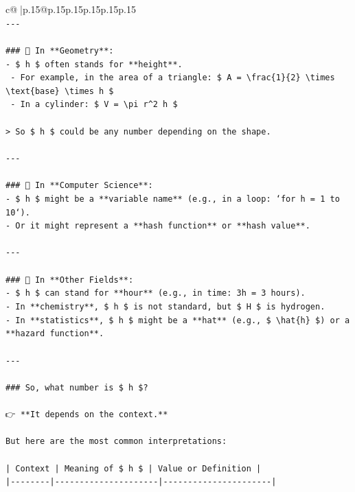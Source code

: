 \documentclass{article}
\begin{document}
{\begin{supertabular}{c@{$\;$}|p{.15\linewidth}@{}p{.15\linewidth}p{.15\linewidth}p{.15\linewidth}p{.15\linewidth}p{.15\linewidth}}
{{{\\ 
\texttt{{-}{-}{-}} \\
\\ 
\texttt{\#\#\# 🔹 In **Geometry**:} \\
\texttt{{-} \$ h \$ often stands for **height**.} \\
\texttt{  {-} For example, in the area of a triangle: \$ A = \textbackslash{}frac\{1\}\{2\} \textbackslash{}times \textbackslash{}text\{base\} \textbackslash{}times h \$} \\
\texttt{  {-} In a cylinder: \$ V = \textbackslash{}pi r\^{}2 h \$} \\
\\ 
\texttt{> So \$ h \$ could be any number depending on the shape.} \\
\\ 
\texttt{{-}{-}{-}} \\
\\ 
\texttt{\#\#\# 🔹 In **Computer Science**:} \\
\texttt{{-} \$ h \$ might be a **variable name** (e.g., in a loop: `for h = 1 to 10`).} \\
\texttt{{-} Or it might represent a **hash function** or **hash value**.} \\
\\ 
\texttt{{-}{-}{-}} \\
\\ 
\texttt{\#\#\# 🔹 In **Other Fields**:} \\
\texttt{{-} \$ h \$ can stand for **hour** (e.g., in time: 3h = 3 hours).} \\
\texttt{{-} In **chemistry**, \$ h \$ is not standard, but \$ H \$ is hydrogen.} \\
\texttt{{-} In **statistics**, \$ h \$ might be a **hat** (e.g., \$ \textbackslash{}hat\{h\} \$) or a **hazard function**.} \\
\\ 
\texttt{{-}{-}{-}} \\
\\ 
\texttt{\#\#\# So, what number is \$ h \$?} \\
\\ 
\texttt{👉 **It depends on the context.**} \\
\\ 
\texttt{But here are the most common interpretations:} \\
\\ 
\texttt{| Context | Meaning of \$ h \$ | Value or Definition |} \\
\texttt{|{-}{-}{-}{-}{-}{-}{-}{-}|{-}{-}{-}{-}{-}{-}{-}{-}{-}{-}{-}{-}{-}{-}{-}{-}{-}{-}{-}{-}{-}|{-}{-}{-}{-}{-}{-}{-}{-}{-}{-}{-}{-}{-}{-}{-}{-}{-}{-}{-}{-}{-}{-}|} \\
}}}
\end{supertabular}}
\end{document}
